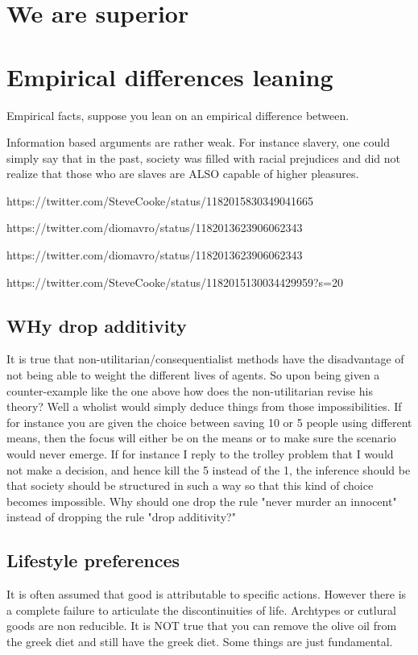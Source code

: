 \documentclass[12pt]{report}
\numberwithin{equation}{section}
\begin{document}
\section{We are superior}

\section{Empirical differences leaning}
Empirical facts, suppose you lean on an empirical difference between. 

Information based arguments are rather weak. For instance slavery, one could simply say that in the past, society was filled with racial prejudices and did not realize that those who are slaves are ALSO capable of higher pleasures. 


https://twitter.com/SteveCooke/status/1182015830349041665

https://twitter.com/diomavro/status/1182013623906062343

https://twitter.com/diomavro/status/1182013623906062343

https://twitter.com/SteveCooke/status/1182015130034429959?s=20

\subsection{WHy drop additivity}

It is true that non-utilitarian/consequentialist methods have the disadvantage of not being able to weight the different lives of agents. So upon being given a counter-example like the one above how does the non-utilitarian revise his theory? Well a wholist would simply deduce things from those impossibilities. If for instance you are given the choice between saving 10 or 5 people using different means, then the focus will either be on the means or to make sure the scenario would never emerge. If for instance I reply to the trolley problem that I would not make a decision, and hence kill the 5 instead of the 1, the inference should be that society should be structured in such a way so that this kind of choice becomes impossible. Why should one drop the rule "never murder an innocent" instead of dropping the rule "drop additivity?" 


\subsection{Lifestyle preferences}

It is often assumed that good is attributable to specific actions. However there is a complete failure to articulate the discontinuities of life. Archtypes or cutlural goods are non reducible. It is NOT true that you can remove the olive oil from the greek diet and still have the greek diet. Some things are just fundamental. 
\end{document}
